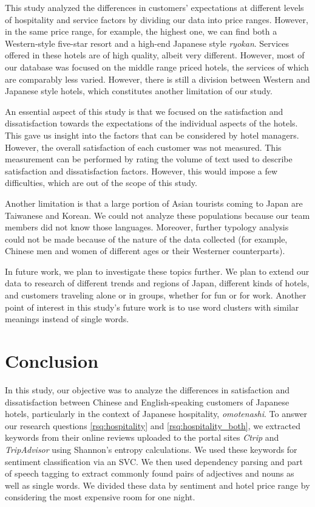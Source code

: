 \documentclass[smallextended,natbib]{svjour3}       %
\begin{document}
  This study analyzed the differences in customers' expectations at different levels of hospitality and service factors by dividing our data into price ranges. However, in the same price range, for example, the highest one, we can find both a Western-style five-star resort and a high-end Japanese style \textit{ryokan}. Services offered in these hotels are of high quality, albeit very different. However, most of our database was focused on the middle range priced hotels, the services of which are comparably less varied. However, there is still a division between Western and Japanese style hotels, which constitutes another limitation of our study.

  An essential aspect of this study is that we focused on the satisfaction and dissatisfaction towards the expectations of the individual aspects of the hotels. This gave us insight into the factors that can be considered by hotel managers. However, the overall satisfaction of each customer was not measured. This measurement can be performed by rating the volume of text used to describe satisfaction and dissatisfaction factors. However, this would impose a few difficulties, which are out of the scope of this study. 

  Another limitation is that a large portion of Asian tourists coming to Japan are Taiwanese and Korean. We could not analyze these populations because our team members did not know those languages. Moreover, further typology analysis could not be made because of the nature of the data collected (for example, Chinese men and women of different ages or their Westerner counterparts).

  In future work, we plan to investigate these topics further. We plan to extend our data to research of different trends and regions of Japan, different kinds of hotels, and customers traveling alone or in groups, whether for fun or for work. Another point of interest in this study's future work is to use word clusters with similar meanings instead of single words. 

\section{Conclusion}\label{conclusion}

  In this study, our objective was to analyze the differences in satisfaction and dissatisfaction between Chinese and English-speaking customers of Japanese hotels, particularly in the context of Japanese hospitality, \textit{omotenashi}. To answer our research questions \ref{rsq:hospitality} and \ref{rsq:hospitality_both}, we extracted keywords from their online reviews uploaded to the portal sites \textit{Ctrip} and \textit{TripAdvisor} using Shannon's entropy calculations. We used these keywords for sentiment classification via an SVC. We then used dependency parsing and part of speech tagging to extract commonly found pairs of adjectives and nouns as well as single words. We divided these data by sentiment and hotel price range by considering the most expensive room for one night. 
\end{document}
